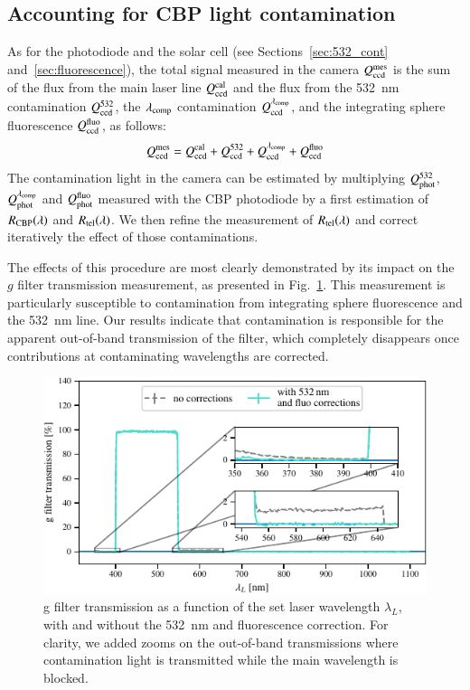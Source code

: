 \subsection{Accounting for CBP light contamination}\label{sec:sd_contaminations}

As for the photodiode and the solar cell (see Sections~\ref{sec:532_cont} and~\ref{sec:fluorescence}), the total signal measured in the \SD camera $Q_{\mathrm{ccd}}^{\mathrm{mes}}$ is the sum of the flux from the main laser line $Q_{\mathrm{ccd}}^{\mathrm{cal}}$ and the flux from the \SI{532}{\nm} contamination $Q_{\mathrm{ccd}}^{532}$, the $\lambda_{\rm comp}$ contamination $Q_{\mathrm{ccd}}^{\lambda_{\rm comp}}$, and the integrating sphere fluorescence $Q_{\mathrm{ccd}}^{\mathrm{fluo}}$, as follows:
\begin{equation}
    Q_{\mathrm{ccd}}^{\mathrm{mes}} = Q_{\mathrm{ccd}}^{\mathrm{cal}} + Q_{\mathrm{ccd}}^{532} + Q_{\mathrm{ccd}}^{\lambda_{\rm comp}} + Q_{\mathrm{ccd}}^{\mathrm{fluo}}
    \label{eq:qccd_mes}
\end{equation}
The contamination light in the \SD camera can be estimated by multiplying $Q_{\mathrm{phot}}^{532}$, $Q_{\mathrm{phot}}^{\lambda_{\rm comp}}$ and $Q_{\mathrm{phot}}^{\mathrm{fluo}}$ measured with the CBP photodiode by a first estimation of $R_{\mathrm{CBP}}(\lambda)$ and $R_{\mathrm{tel}}(\lambda)$. We then refine the measurement of $R_{\mathrm{tel}}(\lambda)$ and correct iteratively the effect of those contaminations.

The effects of this procedure are most clearly demonstrated by its impact on the \SD $g$ filter transmission measurement, as presented in Fig.~\ref{fig:g_filter_532}. This measurement is particularly susceptible to contamination from integrating sphere fluorescence and the \SI{532}{\nano\meter} line. Our results indicate that contamination is responsible for the apparent out-of-band transmission of the filter, which completely disappears once contributions at contaminating wavelengths are corrected.

\begin{figure}%
    \centering
    \includegraphics[width=\columnwidth]{fig/g_filter_532.pdf}
    \caption{\SD g filter transmission as a function of the set laser wavelength $\lambda_L$, with and without the \SI{532}{\nm} and fluorescence correction. For clarity, we added zooms on the out-of-band transmissions where contamination light is transmitted while the main wavelength is blocked.}
    \label{fig:g_filter_532}
\end{figure}


